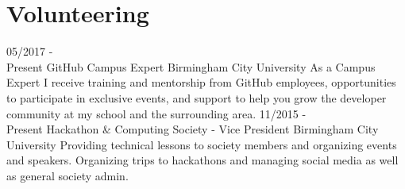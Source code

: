 \documentclass[]{friggeri-cv}
\begin{document}
\section{Volunteering}
    \begin{entrylist}
    \entry
    {05/2017 - \\ Present}
    {GitHub Campus Expert}
    {Birmingham City University}
    {As a Campus Expert I receive training and mentorship from GitHub employees, opportunities to participate in exclusive events, and support to help you grow the developer community at my school and the surrounding area. }
    \entry
    {11/2015 - \\ Present}
    {Hackathon \& Computing Society - Vice President}
    {Birmingham City University}
    {Providing technical lessons to society members and organizing events and speakers.  Organizing trips to hackathons and managing social media as well as general society admin. }
    \end{entrylist}
\end{document}
